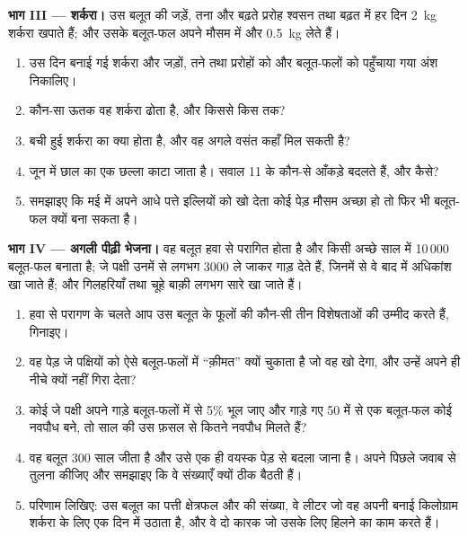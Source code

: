 \begin{problem}[{सप्ताहांत समस्या --- किसी पेड़ के लेन-देन का हिसाब: पत्ते
और रंध्र गिने गए, पानी उठाया गया और शर्करा बनाई गई, फ्लोएम की सप्लाई, और
बाहर भेजे गए बीज}]
\medskip
\noindent\textbf{भाग III --- शर्करा।}
उस बलूत की जड़ें, तना और बढ़ते प्ररोह श्वसन तथा बढ़त में हर दिन \qty{2}{kg}
शर्करा खपाते हैं; और उसके बलूत-फल अपने मौसम में और \qty{0.5}{kg} लेते हैं।
\begin{enumerate}[resume]
  \item उस दिन बनाई गई शर्करा और जड़ों, तने तथा प्ररोहों को और बलूत-फलों को
        पहुँचाया गया अंश निकालिए।
  \item कौन-सा ऊतक वह शर्करा ढोता है, और किससे किस तक?
  \item बची हुई शर्करा का क्या होता है, और वह अगले वसंत कहाँ मिल सकती है?
  \item जून में छाल का एक छल्ला काटा जाता है। सवाल 11 के कौन-से आँकड़े
        बदलते हैं, और कैसे?
  \item समझाइए कि मई में अपने आधे पत्ते इल्लियों को खो देता कोई पेड़ मौसम
        अच्छा हो तो फिर भी बलूत-फल क्यों बना सकता है।
\end{enumerate}

\medskip
\noindent\textbf{भाग IV --- अगली पीढ़ी भेजना।}
वह बलूत हवा से परागित होता है और किसी अच्छे साल में 10\,000 बलूत-फल बनाता
है; जे पक्षी उनमें से लगभग 3000 ले जाकर गाड़ देते हैं, जिनमें से वे बाद में
अधिकांश खा जाते हैं; और गिलहरियाँ तथा चूहे बाक़ी लगभग सारे खा जाते हैं।
\begin{enumerate}[resume]
  \item हवा से परागण के चलते आप उस बलूत के फूलों की कौन-सी तीन विशेषताओं की
        उम्मीद करते हैं, गिनाइए।
  \item वह पेड़ जे पक्षियों को ऐसे बलूत-फलों में ``क़ीमत'' क्यों चुकाता है
        जो वह खो देगा, और उन्हें अपने ही नीचे क्यों नहीं गिरा देता?
  \item कोई जे पक्षी अपने गाड़े बलूत-फलों में से 5\% भूल जाए और गाड़े गए 50
        में से एक बलूत-फल कोई नवपौध बने, तो साल की उस फ़सल से कितने नवपौध
        मिलते हैं?
  \item वह बलूत 300 साल जीता है और उसे एक ही वयस्क पेड़ से बदला जाना है।
        अपने पिछले जवाब से तुलना कीजिए और समझाइए कि वे संख्याएँ क्यों ठीक
        बैठती हैं।
  \item परिणाम लिखिए: उस बलूत का पत्ती क्षेत्रफल और  की संख्या, वे
        लीटर जो वह अपनी बनाई किलोग्राम शर्करा के लिए एक दिन में उठाता है,
        और वे दो कारक जो उसके लिए हिलने का काम करते हैं।
\end{enumerate}
\end{problem}
